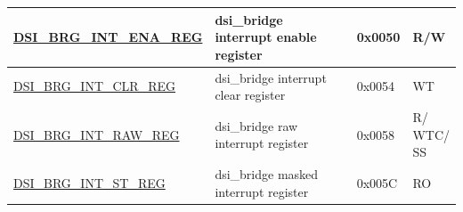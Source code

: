 \begin{longtable}{ | p{6.8cm} | p{6.5cm} | p{1.2cm} | p{1cm} | }
\hyperref[regdesc:DSIBRGINTENAREG]{DSI\_BRG\_INT\_ENA\_REG} & dsi\_bridge interrupt enable register & 0x0050 & R/W \\ \hline
\hyperref[regdesc:DSIBRGINTCLRREG]{DSI\_BRG\_INT\_CLR\_REG} & dsi\_bridge interrupt clear register & 0x0054 & WT \\ \hline
\hyperref[regdesc:DSIBRGINTRAWREG]{DSI\_BRG\_INT\_RAW\_REG} & dsi\_bridge raw interrupt register & 0x0058 & \makecell[l]{R/\\WTC/\\SS} \\ \hline
\hyperref[regdesc:DSIBRGINTSTREG]{DSI\_BRG\_INT\_ST\_REG} & dsi\_bridge masked interrupt register & 0x005C & RO \\ \hline
\end{longtable}
